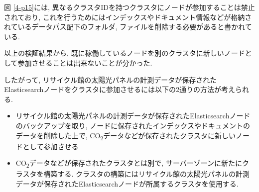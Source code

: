 図 \ref{4-p15}には, 異なるクラスタIDを持つクラスタにノードが参加することは禁止されており, これを行うためにはインデックスやドキュメント情報などが格納されているデータパス配下のフォルダ, ファイルを削除する必要があると書かれている.

以上の検証結果から, 既に稼働しているノードを別のクラスタに新しいノードとして参加させることは出来ないことが分かった.

したがって, リサイクル館の太陽光パネルの計測データが保存されたElasticsearchノードをクラスタに参加させるには以下の2通りの方法が考えられる.

\begin{itemize}
  \item リサイクル館の太陽光パネルの計測データが保存されたElasticsearchノードのバックアップを取り, ノードに保存されたインデックスやドキュメントのデータを削除した上で, CO\textsubscript{2}データなどが保存されたクラスタに新しいノードとして参加させる
  \item CO\textsubscript{2}データなどが保存されたクラスタとは別で, サーバーゾーンに新たにクラスタを構築する. クラスタの構築にはリサイクル館の太陽光パネルの計測データが保存されたElasticsearchノードが所属するクラスタを使用する.
\end{itemize}







